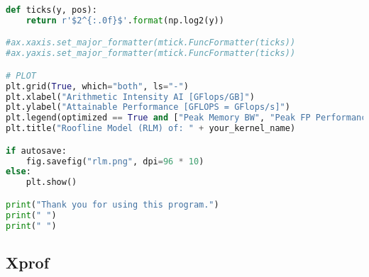 \begin{lstlisting}[language=python,breaklines=true]
def ticks(y, pos):
    return r'$2^{:.0f}$'.format(np.log2(y))

#ax.xaxis.set_major_formatter(mtick.FuncFormatter(ticks))
#ax.yaxis.set_major_formatter(mtick.FuncFormatter(ticks))

# PLOT
plt.grid(True, which="both", ls="-")
plt.xlabel("Arithmetic Intensity AI [GFlops/GB]")
plt.ylabel("Attainable Performance [GFLOPS = GFlops/s]")
plt.legend(optimized == True and ["Peak Memory BW", "Peak FP Performance", "Ridge Point", "Your Kernel", "Your Optimized Kernel"] or ["Peak Memory BW", "Peak FP Performance", "Ridge Point", "Your Kernel"], loc='best')
plt.title("Roofline Model (RLM) of: " + your_kernel_name)

if autosave:
    fig.savefig("rlm.png", dpi=96 * 10)
else:
    plt.show()

print("Thank you for using this program.")
print(" ")
print(" ")

\end{lstlisting}

\subsection{Xprof}

